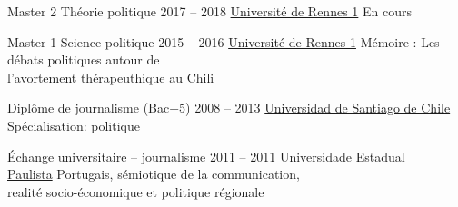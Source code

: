 


%
%








\begin{coordinatelist}
\end{coordinatelist}









%
%




\begin{yearlist}

\item[Master 2 Théorie politique]{2017 -- 2018}
     {\href{https://formations.univ-rennes1.fr/formations/master-2-theorie-politique}{Université de Rennes 1}}
     {En cours}
     

\item[Master 1 Science politique]{2015 -- 2016}
     {\href{https://formations.univ-rennes1.fr/formations/master-1-science-politique}{Université de Rennes 1}}
     {Mémoire : Les débats politiques autour de \\ l'avortement
     thérapeuthique au Chili}


\item[Diplôme de journalisme (Bac+5)]{2008 -- 2013}
     {\href{http://periodismo.usach.cl/} {Universidad de Santiago de Chile}}
     {Spécialisation: politique}


\item[Échange universitaire -- journalisme]{2011 -- 2011}
     {\href{http://www.unesp.br/} {Universidade Estadual \\ Paulista}}
     {Portugais, sémiotique de la communication,\\ 
     realité socio-économique et politique régionale}


\end{yearlist}





